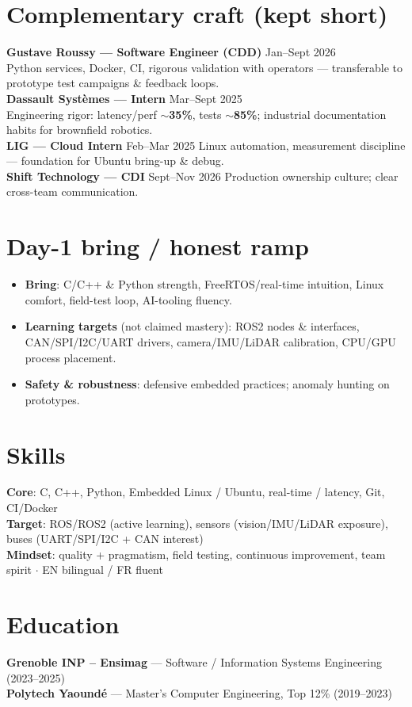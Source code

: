 \documentclass[10pt,a4paper]{article}
\begin{document}
\section{Complementary craft (kept short)}
\textbf{Gustave Roussy --- Software Engineer (CDD)} \hfill Jan--Sept 2026\\
Python services, Docker, CI, rigorous validation with operators --- transferable to prototype test campaigns \& feedback loops.\\[2pt]
\textbf{Dassault Syst\`emes --- Intern} \hfill Mar--Sept 2025\\
Engineering rigor: latency/perf \textbf{$\sim$35\%}, tests \textbf{$\sim$85\%}; industrial documentation habits for brownfield robotics.\\[2pt]
\textbf{LIG --- Cloud Intern} \hfill Feb--Mar 2025 \quad Linux automation, measurement discipline --- foundation for Ubuntu bring-up \& debug.\\[2pt]
\textbf{Shift Technology --- CDI} \hfill Sept--Nov 2026 \quad Production ownership culture; clear cross-team communication.

\section{Day-1 bring / honest ramp}
\begin{itemize}
  \item \textbf{Bring}: C/C++ \& Python strength, FreeRTOS/real-time intuition, Linux comfort, field-test loop, AI-tooling fluency.
  \item \textbf{Learning targets} (not claimed mastery): ROS2 nodes \& interfaces, CAN/SPI/I2C/UART drivers, camera/IMU/LiDAR calibration, CPU/GPU process placement.
  \item \textbf{Safety \& robustness}: defensive embedded practices; anomaly hunting on prototypes.
\end{itemize}

\section{Skills}
\textbf{Core}: C, C++, Python, Embedded Linux / Ubuntu, real-time / latency, Git, CI/Docker\\
\textbf{Target}: ROS/ROS2 (active learning), sensors (vision/IMU/LiDAR exposure), buses (UART/SPI/I2C + CAN interest)\\
\textbf{Mindset}: quality + pragmatism, field testing, continuous improvement, team spirit $\cdot$ EN bilingual / FR fluent

\section{Education}
\textbf{Grenoble INP -- Ensimag} --- Software / Information Systems Engineering (2023--2025)\\
\textbf{Polytech Yaound\'e} --- Master's Computer Engineering, Top 12\% (2019--2023)
\end{document}
